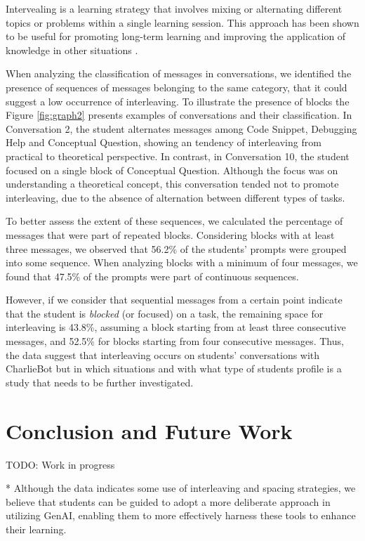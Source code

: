 \documentclass[a4paper,twoside]{article}
\begin{document}
Intervealing is a learning strategy that involves mixing or alternating
different topics or problems within a single learning session. This approach has
been shown to be useful for promoting long-term learning and improving the
application of knowledge in other situations \citep{Rivers21}.

When analyzing the classification of messages in conversations, we identified
the presence of sequences of messages belonging to the same category, that it
could suggest a low occurrence of interleaving. To illustrate the presence of
blocks the Figure \ref{fig:graph2} presents examples of conversations and their
classification. In Conversation 2, the student alternates messages among Code
Snippet, Debugging Help and Conceptual Question, showing an tendency of
interleaving from practical to theoretical perspective. In contrast, in
Conversation 10, the student focused on a single block of Conceptual Question.
Although the focus was on understanding a theoretical concept, this conversation
tended not to promote interleaving, due to the absence of alternation between
different types of tasks.

To better assess the extent of these sequences, we calculated the percentage of
messages that were part of repeated blocks. Considering blocks with at least
three messages, we observed that 56.2\% of the students' prompts were grouped
into some sequence. When analyzing blocks with a minimum of four messages, we
found that 47.5\% of the prompts were part of continuous sequences.

However, if we consider that sequential messages from a certain point indicate
that the student is \textit{blocked} (or focused) on a task, the remaining space
for interleaving is 43.8\%, assuming a block starting from at least three
consecutive messages, and 52.5\% for blocks starting from four consecutive
messages. Thus, the data suggest that interleaving occurs on students'
conversations with CharlieBot but in which situations and with what type of
students profile is a study that needs to be further investigated.

\section{Conclusion and Future Work}

TODO: Work in progress

* Although the data indicates some use of interleaving and spacing strategies,
we believe that students can be guided to adopt a more deliberate approach in
utilizing GenAI, enabling them to more effectively harness these tools to
enhance their learning.
\end{document}

